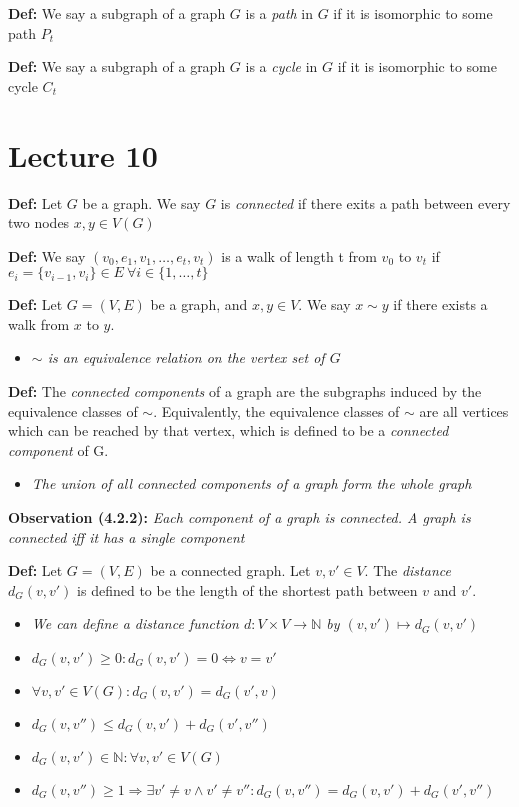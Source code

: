 \documentclass[12pt]{article}
\begin{document}
\textbf{Def: }We say a subgraph of a graph $G$ is a \emph{path} in $G$ if it is isomorphic to some path $P_{t}$

\textbf{Def: }We say a subgraph of a graph $G$ is a \emph{cycle} in $G$ if it is isomorphic to some cycle $C_{t}$
\clearpage

\section{Lecture 10}
\textbf{Def: }Let $G$ be a graph. We say $G$ is \emph{connected} if there exits a path between every two nodes $x, y \in V(G)$

\textbf{Def: }We say $(v_0, e_1, v_1, \dots, e_t, v_t)$ is a walk of length t from $v_0$ to $v_t$ if \\ $e_i = \{ v_{i - 1}, v_i \} \in E\ \forall i \in \{ 1, \dots, t \}$ 

\textbf{Def: }Let $G = (V, E)$ be a graph, and $x, y \in V$. We say $x \sim y$ if there exists a walk from $x$ to $y$. 
\begin{itemize}
    \item \emph{$\sim$ is an equivalence relation on the vertex set of $G$}
\end{itemize}

\textbf{Def: }The \emph{connected components} of a graph are the subgraphs induced by the equivalence classes of $\sim$. Equivalently, the equivalence classes of $\sim$ are all vertices which can be reached by that vertex, which is defined to be a \emph{connected component} of G.
\begin{itemize}
    \item \emph{The union of all connected components of a graph form the whole graph}
\end{itemize}

\textbf{Observation (4.2.2): }\emph{Each component of a graph is connected. A graph is connected iff it has a single component}

\textbf{Def: }Let $G = (V, E)$ be a connected graph. Let $v, v' \in V$. The \emph{distance} $d_{G}(v, v')$ is defined to be the length of the shortest path between $v$ and $v'$.
\begin{itemize}
    \item \emph{We can define a distance function $d: V \times V \rightarrow \mathbb{N}$ by $(v, v') \mapsto d_{G}(v, v')$}
    \item \emph{$d_{G}(v, v') \geq 0 : d_{G}(v, v') = 0 \Leftrightarrow v = v'$}
    \item \emph{$\forall v, v' \in V(G) : d_{G}(v, v') = d_{G}(v', v)$}
    \item \emph{$d_{G}(v, v'') \leq d_{G}(v, v') + d_{G}(v', v'')$}
    \item \emph{$d_{G}(v, v') \in \mathbb{N} : \forall v, v' \in V(G)$}
    \item \emph{$d_{G}(v, v'') \geq 1 \Rightarrow \exists v' \neq v \land v' \neq v'' : d_{G}(v, v'') = d_{G}(v, v') + d_{G}(v', v'')$}
\end{itemize}
\end{document}
